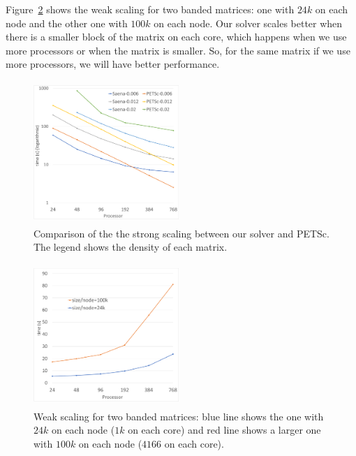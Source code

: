 Figure~\ref{fig:weak1} shows the weak scaling for two banded matrices: one with $24k$ on each node and the other one with $100k$ on each node. Our solver scales better when there is a smaller block of the matrix on each core, which happens when we use more processors or when the matrix is smaller. So, for the same matrix if we use more processors, we will have better performance.

\begin{figure}[tbh]
    \centering
    \includegraphics[width=5.5cm,height=5.4cm]{./figures/strong_size_vs_petsc.pdf}
    \caption{Comparison of the the strong scaling between our solver and PETSc. The legend shows the density of each matrix.}
    \label{fig:petsc1}
    \Description{}
\end{figure}

\begin{figure}[tbh]
    \centering
    \includegraphics[width=5.5cm,height=5.4cm]{./figures/weak1.pdf}
    \caption{Weak scaling for two banded matrices: blue line shows the one with $24k$ on each node ($1k$ on each core) and red line shows a larger one with $100k$ on each node ($4166$ on each core).}
    \label{fig:weak1}
    \Description{}
\end{figure}

